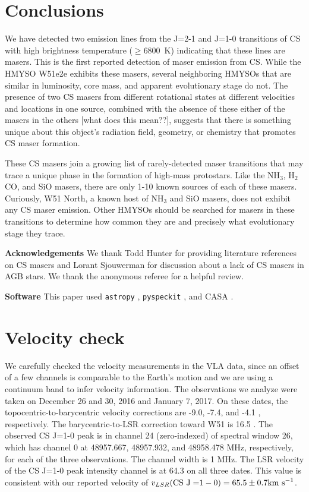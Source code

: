 \documentclass[twocolumn]{aastex62}
\begin{document}
\section{Conclusions}
We have detected two emission lines from the J=2-1 and J=1-0 transitions of CS
with high brightness temperature ($\geq$6800~K) indicating that these lines are masers.
This is the first reported detection of maser emission from CS.
While the HMYSO W51e2e exhibits these masers, several neighboring HMYSOs that
are similar in luminosity, core mass, and apparent evolutionary stage
do not.  The presence of two CS masers from different rotational states
at different velocities and locations in one source, 
{\color{red} combined with the absence of these
either of the masers in the others [what does this mean??]}, suggests that there is something
unique about this object's radiation field, geometry, or chemistry that
promotes CS maser formation.

These CS masers join a growing list of rarely-detected maser transitions
that may trace a unique phase in the formation of high-mass protostars.
Like the NH$_3$, H$_2$CO, and SiO masers, there are only 1-10 known sources of
each of these masers.  Curiously, W51 North, a known host of NH$_3$ and SiO masers,
does not exhibit any CS maser emission.  Other HMYSOs should be searched for
masers in these transitions to determine how common they are and precisely
what evolutionary stage they trace.

\textbf{Acknowledgements}
We thank Todd Hunter for providing literature references on CS masers and
Lorant Sjouwerman for discussion about a lack of CS masers in AGB stars.
We thank the anonymous referee for a helpful review.

\textbf{Software}
This paper used \texttt{astropy}
\citep{Astropy-Collaboration2013a,Astropy-Collaboration2018a},
\texttt{pyspeckit} \citep{Ginsburg2011c}, and CASA \citep{McMullin2007a}.

\appendix
\section{Velocity check}
We carefully checked the velocity measurements in the VLA data, since an offset
of a few channels is comparable to the Earth's motion and we are using a
continuum band to infer velocity information.  The observations we analyze were
taken on December 26 and 30, 2016 and January 7, 2017.  On these dates, the
topocentric-to-barycentric velocity corrections are -9.0, -7.4, and -4.1 \kms,
respectively.  The barycentric-to-LSR correction toward W51 is 16.5 \kms.  The
observed CS J=1-0 peak is in channel 24 (zero-indexed) of spectral window 26,
which has channel 0 at  48957.667, 48957.932, and 48958.478 MHz, respectively,
for each of the three observations.  The channel width is 1 MHz.  The LSR
velocity of the CS J=1-0 peak intensity channel is at 64.3 \kms on all three
dates.  This value is consistent with our reported velocity of
$v_{LSR}(\mathrm{CS~J=}1-0) = 65.5 \pm 0.7 \textrm{km~s}^{-1}$.
\end{document}
